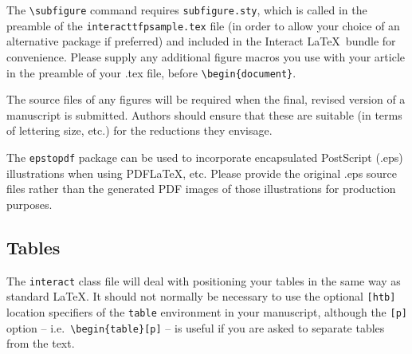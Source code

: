 \documentclass[]{interact}
\theoremstyle{plain}%
\theoremstyle{definition}
\theoremstyle{remark}
\begin{document}
The \verb"\subfigure" command requires \verb"subfigure.sty", which is called in the preamble of the \texttt{interacttfpsample.tex} file (in order to allow your choice of an alternative package if preferred) and included in the \textsf{Interact} \LaTeX\ bundle for convenience. Please supply any additional figure macros you use with your article in the preamble of your .tex file, before \verb"\begin{document}".

The source files of any figures will be required when the final, revised version of a manuscript is submitted. Authors should ensure that these are suitable (in terms of lettering size, etc.) for the reductions they envisage.

The \texttt{epstopdf} package can be used to incorporate encapsulated PostScript (.eps) illustrations when using PDF\LaTeX, etc. Please provide the original .eps source files rather than the generated PDF images of those illustrations for production purposes.


\subsection{Tables}

The \texttt{interact} class file will deal with positioning your tables in the same way as standard \LaTeX. It should not normally be necessary to use the optional \texttt{[htb]} location specifiers of the \texttt{table} environment in your manuscript, although the \texttt{[p]} option -- i.e.\ \verb"\begin{table}[p]" -- is useful if you are asked to separate tables from the text.
\end{document}
